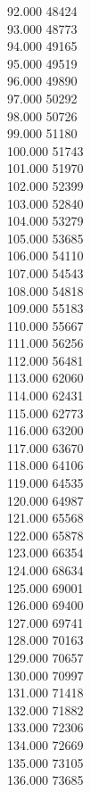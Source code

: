 { 92.000	48424 \\
 93.000	48773 \\
 94.000	49165 \\
 95.000	49519 \\
 96.000	49890 \\
 97.000	50292 \\
 98.000	50726 \\
 99.000	51180 \\
 100.000	51743 \\
 101.000	51970 \\
 102.000	52399 \\
 103.000	52840 \\
 104.000	53279 \\
 105.000	53685 \\
 106.000	54110 \\
 107.000	54543 \\
 108.000	54818 \\
 109.000	55183 \\
 110.000	55667 \\
 111.000	56256 \\
 112.000	56481 \\
 113.000	62060 \\
 114.000	62431 \\
 115.000	62773 \\
 116.000	63200 \\
 117.000	63670 \\
 118.000	64106 \\
 119.000	64535 \\
 120.000	64987 \\
 121.000	65568 \\
 122.000	65878 \\
 123.000	66354 \\
 124.000	68634 \\
 125.000	69001 \\
 126.000	69400 \\
 127.000	69741 \\
 128.000	70163 \\
 129.000	70657 \\
 130.000	70997 \\
 131.000	71418 \\
 132.000	71882 \\
 133.000	72306 \\
 134.000	72669 \\
 135.000	73105 \\
 136.000	73685 \\
}
